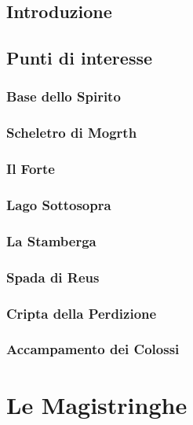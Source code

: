 \documentclass[10pt,twoside,onecolumn,openany]{book}
\begin{document}
\section{Introduzione}
\newpage
\section{Punti di interesse}
\subsection{Base dello Spirito}
\newpage
\subsection{Scheletro di Mogrth}
\newpage
\subsection{Il Forte}
\newpage
\subsection{Lago Sottosopra}
\newpage
\subsection{La Stamberga}
\newpage
\subsection{Spada di Reus}
\newpage
\subsection{Cripta della Perdizione}
\newpage
\subsection{Accampamento dei Colossi}
\newpage
\chapter{Le Magistringhe}
\end{document}
